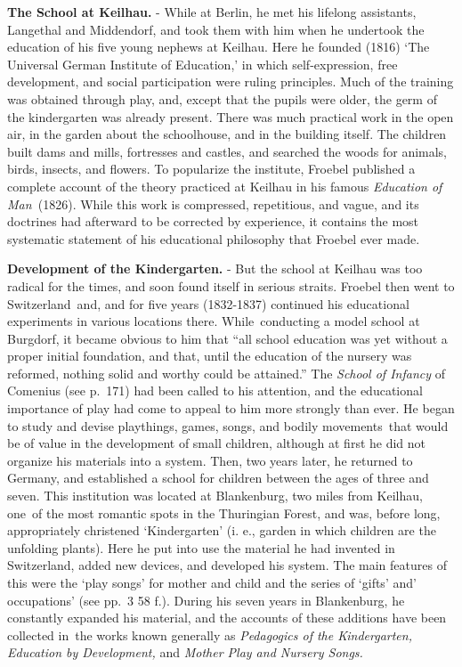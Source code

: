 \documentclass[
]{book}
\begin{document}
\textbf{The School at Keilhau.} - While at Berlin, he met his lifelong assistants, Langethal and Middendorf, and took them with him when he undertook the education of his five young nephews at Keilhau. Here he founded (1816) `The Universal German Institute of Education,' in which self-expression, free development, and social participation were ruling principles. Much of the training was obtained through play, and, except that the pupils were older, the germ of the kindergarten was already present. There was much practical work in the open air, in the garden about the schoolhouse, and in the building itself. The children built dams and mills, fortresses and castles, and searched the woods for animals, birds, insects, and flowers. To popularize the institute, Froebel published a complete account of the theory practiced at Keilhau in his famous \emph{Education of Man~}(1826). While this work is compressed, repetitious, and vague, and its doctrines had afterward to be corrected by experience, it contains the most systematic statement of his educational philosophy that Froebel ever made.

\textbf{Development of the Kindergarten.} - But the school at Keilhau was too radical for the times, and soon found itself in serious straits. Froebel then went to Switzerland~and, and for five years (1832-1837) continued his educational experiments in various locations there. While~conducting a model school at Burgdorf, it became obvious to him that ``all school education was yet without a proper initial foundation, and that, until the education of the nursery was reformed, nothing solid and worthy could be attained.'' The \emph{School of Infancy} of Comenius (see p.~171) had been called to his attention, and the educational importance of play had come to appeal to him more strongly than ever. He began to study and devise playthings, games, songs, and bodily movements~that would be of value in the development of small children, although at first he did not organize his materials into a system. Then, two years later, he returned to Germany, and established a school for children between the ages of three and seven. This institution was located at Blankenburg, two miles from Keilhau, one~of the most romantic spots in the Thuringian Forest, and was, before long, appropriately christened `Kindergarten' (i. e., garden in which children are the unfolding plants). Here he put into use the material he had invented in Switzerland, added new devices, and developed his system. The main features of this were the `play songs' for mother and child and the series of `gifts' and' occupations' (see pp.~3 58 f.). During his seven years in Blankenburg, he constantly expanded his material, and the accounts of these additions have been collected in~the works known generally as \emph{Pedagogics of the Kindergarten, Education by Development,} and \emph{Mother Play and Nursery Songs.}
\end{document}
